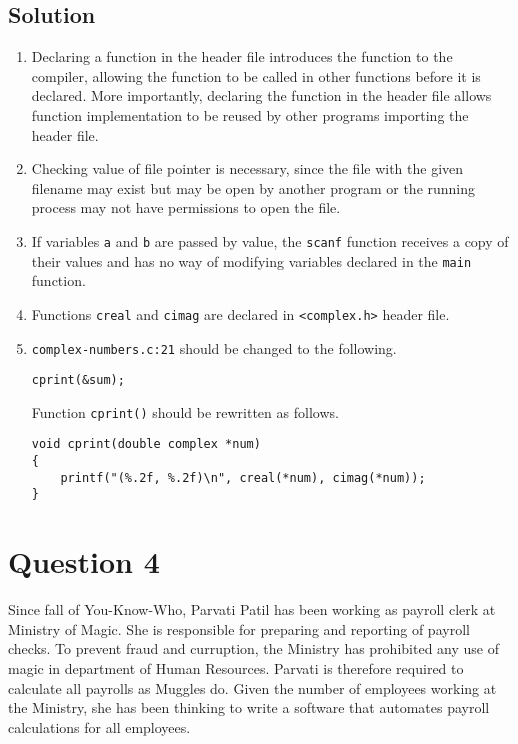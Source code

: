 \documentclass[12pt,letterpaper,twoside]{article}
\begin{document}
\newpage

\subsection*{Solution}

\begin{enumerate}
\item
Declaring a function in the header file introduces the function to the compiler, allowing the function to be called in other functions before it is declared.
More importantly, declaring the function in the header file allows function implementation to be reused by other programs importing the header file.

\item
Checking value of file pointer is necessary, since the file with the given filename may exist but may be open by another program or the running process may not have permissions to open the file.

\item
If variables \texttt{a} and \texttt{b} are passed by value, the \texttt{scanf} function receives a copy of their values and has no way of modifying variables declared in the \texttt{main} function.

\item
Functions \texttt{creal} and \texttt{cimag} are declared in \texttt{<complex.h>} header file.

\item
\texttt{complex-numbers.c:21} should be changed to the following.
\begin{lstlisting}[numbers=none]
cprint(&sum);
\end{lstlisting}

Function \texttt{cprint()} should be rewritten as follows.
\begin{lstlisting}[numbers=none]
void cprint(double complex *num)
{
	printf("(%.2f, %.2f)\n", creal(*num), cimag(*num));
}
\end{lstlisting}

\end{enumerate}

\newpage

\section*{Question 4}

Since fall of You-Know-Who, Parvati Patil has been working as payroll clerk at Ministry of Magic.
She is responsible for preparing and reporting of payroll checks.
To prevent fraud and curruption, the Ministry has prohibited any use of magic in department of Human Resources.
Parvati is therefore required to calculate all payrolls as Muggles do.
Given the number of employees working at the Ministry, she has been thinking to write a software that automates payroll calculations for all employees.
\end{document}
